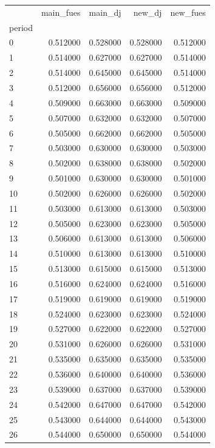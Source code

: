 \begin{tabular}{lrrrr}
\toprule
 & main_fues & main_dj & new_dj & new_fues \\
period &  &  &  &  \\
\midrule
0 & 0.512000 & 0.528000 & 0.528000 & 0.512000 \\
1 & 0.514000 & 0.627000 & 0.627000 & 0.514000 \\
2 & 0.514000 & 0.645000 & 0.645000 & 0.514000 \\
3 & 0.512000 & 0.656000 & 0.656000 & 0.512000 \\
4 & 0.509000 & 0.663000 & 0.663000 & 0.509000 \\
5 & 0.507000 & 0.632000 & 0.632000 & 0.507000 \\
6 & 0.505000 & 0.662000 & 0.662000 & 0.505000 \\
7 & 0.503000 & 0.630000 & 0.630000 & 0.503000 \\
8 & 0.502000 & 0.638000 & 0.638000 & 0.502000 \\
9 & 0.501000 & 0.630000 & 0.630000 & 0.501000 \\
10 & 0.502000 & 0.626000 & 0.626000 & 0.502000 \\
11 & 0.503000 & 0.613000 & 0.613000 & 0.503000 \\
12 & 0.505000 & 0.623000 & 0.623000 & 0.505000 \\
13 & 0.506000 & 0.613000 & 0.613000 & 0.506000 \\
14 & 0.510000 & 0.613000 & 0.613000 & 0.510000 \\
15 & 0.513000 & 0.615000 & 0.615000 & 0.513000 \\
16 & 0.516000 & 0.624000 & 0.624000 & 0.516000 \\
17 & 0.519000 & 0.619000 & 0.619000 & 0.519000 \\
18 & 0.524000 & 0.623000 & 0.623000 & 0.524000 \\
19 & 0.527000 & 0.622000 & 0.622000 & 0.527000 \\
20 & 0.531000 & 0.626000 & 0.626000 & 0.531000 \\
21 & 0.535000 & 0.635000 & 0.635000 & 0.535000 \\
22 & 0.536000 & 0.640000 & 0.640000 & 0.536000 \\
23 & 0.539000 & 0.637000 & 0.637000 & 0.539000 \\
24 & 0.542000 & 0.647000 & 0.647000 & 0.542000 \\
25 & 0.543000 & 0.644000 & 0.644000 & 0.543000 \\
26 & 0.544000 & 0.650000 & 0.650000 & 0.544000 \\

\end{tabular}
